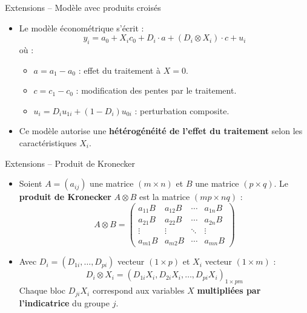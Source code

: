 \documentclass[11pt,aspectratio=169]{beamer}
\begin{document}
\begin{frame}{Extensions -- Modèle avec produits croisés}

\begin{itemize}

\item Le modèle économétrique s'écrit :
  \[
  \boxed{y_i = a_0 + X_i c_0 + D_i \cdot a + (D_i \otimes X_i) \cdot c + u_i}
  \]
  où :
  \begin{itemize}
  \item $a = a_1 - a_0$ : effet du traitement à $X = 0$.
  \item $c = c_1 - c_0$ : modification des pentes par le traitement.
  \item $u_i = D_i u_{1i} + (1-D_i) u_{0i}$ : perturbation composite.
  \end{itemize}

\item Ce modèle autorise une \textbf{hétérogénéité de l'effet du traitement} selon les caractéristiques $X_i$.

\end{itemize}

\end{frame}

\begin{frame}{Extensions -- Produit de Kronecker}

\begin{itemize}

\item Soient $A = (a_{ij})$ une matrice $(m \times n)$ et $B$ une matrice $(p \times q)$. Le \textbf{produit de Kronecker} $A \otimes B$ est la matrice $(mp \times nq)$ :
  \[
  A \otimes B = \begin{pmatrix}
      a_{11} B & a_{12} B & \cdots & a_{1n} B \\
      a_{21} B & a_{22} B & \cdots & a_{2n} B \\
      \vdots & \vdots & \ddots & \vdots \\
      a_{m1} B & a_{m2} B & \cdots & a_{mn} B
  \end{pmatrix}
  \]\newline

\item Avec $D_i = (D_{1i}, \ldots, D_{pi})$ vecteur $(1 \times p)$ et $X_i$ vecteur $(1 \times m)$ :
  \[
  D_i \otimes X_i = (D_{1i} X_i, D_{2i} X_i, \ldots, D_{pi} X_i)_{1 \times pm}
  \]
  Chaque bloc $D_{ji} X_i$ correspond aux variables $X$ \textbf{multipliées par l'indicatrice} du groupe $j$.

\end{itemize}

\end{frame}
\end{document}
